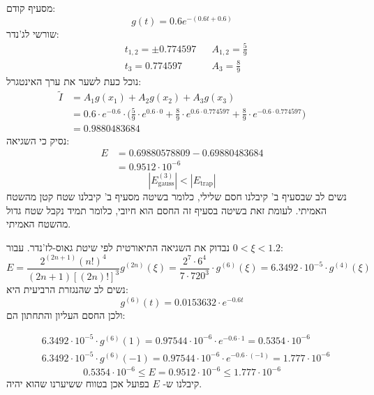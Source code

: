 \documentclass[
  a4paper,
]{article}
\begin{document}
מסעיף קודם: \[g(t)=0.6e^{-(0.6t+0.6)}\] שורשי לג'נדר: \[\begin{aligned}
 & t_{1,2}=\pm 0.774597 &  & A_{1,2}=\frac{5}{9} \\
 & t_{3}=0.774597 &  &  A_{3}=\frac{8}{9}
\end{aligned}\] נוכל כעת לשער את ערך האינטגרל: \[\begin{aligned}
\tilde{I}  & =A_{1}g(x_{1})+A_{2}g(x_{2})+A_{3}g(x_{3}) \\[2ex]
&= 0.6\cdot e^{-0.6}\cdot \Big(\frac{5}{9}\cdot e^{0.6\cdot 0 }+\frac{8}{9}\cdot  e^{0.6\cdot 0.774597 }+\frac{8}{9}\cdot  e^{-0.6\cdot 0.774597 } \Big) \\[2ex]
&=0.9880483684
\end{aligned}\] נסיק כי השגיאה: \[\begin{aligned}
E & =0.69880578809-0.69880483684 \\
 & =\boxed{0.9512\cdot 10^{-6}}
\end{aligned}\]
\[\left| E_{\text{gauss}}^{(3)} \right|<\left| E_{\text{trap}} \right|\]
נשים לב שבסעיף ב' קיבלנו חסם שלילי, כלומר בשיטה מסעיף ב' קיבלנו שטח קטן
מהשטח האמיתי. לעומת זאת בשיטה בסעיף זה החסם הוא חיובי, כלומר תמיד נקבל
שטח גדול מהשטח האמיתי.

נבדוק את השגיאה התיאורטית לפי שיטת גאוס-לז'נדר. עבור \(0<\xi<1.2\):
\[E=\frac{2^{(2n+1)}(n!)^{4}}{(2n+1)[(2n)!]^{3}}g^{(2n)}(\xi)=\frac{2^{7}\cdot 6^{4}}{7\cdot 720^{3}}\cdot g^{(6)}(\xi)=6.3492\cdot 10^{-5}\cdot g^{(4)}(\xi)\]
נשים לב שהנגזרת הרביעית היא: \[g^{(6)}(t)=0.0153632\cdot e^{-0.6t}\]
ולכן החסם העליון והתחתון הם:

\[\begin{aligned}
&6.3492\cdot 10^{-5}\cdot g^{(6)}(1)=0.97544\cdot 10^{-6}\cdot e^{-0.6\cdot 1}= 0.5354\cdot 10^{-6}\\
&6.3492\cdot 10^{-5}\cdot g^{(6)}(-1)=0.97544\cdot 10^{-6}\cdot e^{-0.6\cdot (-1)}=1.777\cdot 10^{-6}
\end{aligned}\]
\[\boxed{0.5354\cdot 10^{-6}\leq E=0.9512\cdot 10^{-6}\leq 1.777\cdot 10^{-6}}\]
קיבלנו ש- \(E\) בפועל אכן בטווח ששיערנו שהוא יהיה.
\end{document}
